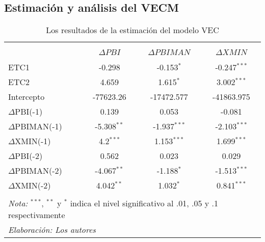 \documentclass[11pt,]{article}
\begin{document}
\hypertarget{estimacion-y-analisis-del-vecm}{%
\subsection{Estimación y análisis del
VECM}\label{estimacion-y-analisis-del-vecm}}

\begin{table}[!htbp] \centering 
  \caption{Los resultados de la estimación del modelo VEC} 
  \label{tab:tb6} 
\small 
\begin{tabular}{@{\extracolsep{5pt}} lccc} 
\\[-1.8ex]\hline 
\hline \\[-1.8ex] 
\\[-1.8ex] & $\Delta PBI$  &  $\Delta PBIMAN$ & $\Delta XMIN$\\
\hline \\[-1.8ex] 
ETC1 & -0.298 & -0.153$^{*}$ & -0.247$^{***}$ \\ 
ETC2 & 4.659 & 1.615$^{*}$ & 3.002$^{***}$ \\ 
Intercepto & -77623.26 & -17472.577 & -41863.975 \\ 
 $\Delta$PBI(-1) & 0.139 & 0.053 & -0.081 \\ 
$\Delta$PBIMAN(-1) & -5.308$^{**}$ & -1.937$^{***}$ & -2.103$^{***}$ \\ 
$\Delta$XMIN(-1) & 4.2$^{***}$ & 1.153$^{***}$ & 1.699$^{***}$ \\ 
$\Delta$PBI(-2) & 0.562 & 0.023 & 0.029 \\ 
$\Delta$PBIMAN(-2) & -4.067$^{**}$ & -1.188$^{*}$ & -1.513$^{***}$ \\ 
$\Delta$XMIN(-2) & 4.042$^{**}$ & 1.032$^{*}$ & 0.841$^{***}$ \\ 
\hline \\[-1.8ex] 
\multicolumn{4}{l}{\footnotesize{\textit{Nota:} $^{***}$, $^{**}$ y $^{*}$ indica el nivel significativo al .01, .05 y .1 respectivamente}} \\ 
\multicolumn{4}{l}{\footnotesize{\textit{Elaboración: Los autores}}} \\ 
\end{tabular} 
\end{table}
\end{document}
